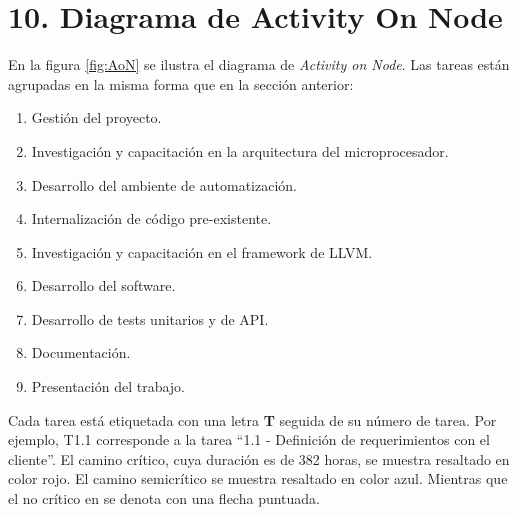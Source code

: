 \section{10. Diagrama de Activity On Node}
\label{sec:AoN}

En la figura \ref{fig:AoN} se ilustra el diagrama de \textit{Activity on Node}. Las tareas están agrupadas en la misma forma que en la sección anterior:

\begin{enumerate}
\item Gestión del proyecto.
\item Investigación y capacitación en la arquitectura del microprocesador.
\item Desarrollo del ambiente de automatización.
\item Internalización de código pre-existente.
\item Investigación y capacitación en el framework de LLVM.
\item Desarrollo del software.
\item Desarrollo de tests unitarios y de API.
\item Documentación.
\item Presentación del trabajo.
\end{enumerate}

Cada tarea está etiquetada con una letra \textbf{T} seguida de su número de tarea. Por ejemplo, T1.1 corresponde a la tarea ``1.1 - Definición de requerimientos con el cliente''. El camino crítico, cuya duración es de 382 horas, se muestra resaltado en color rojo. El camino semicrítico se muestra resaltado en color azul. Mientras que el no crítico en se denota con una flecha puntuada.

